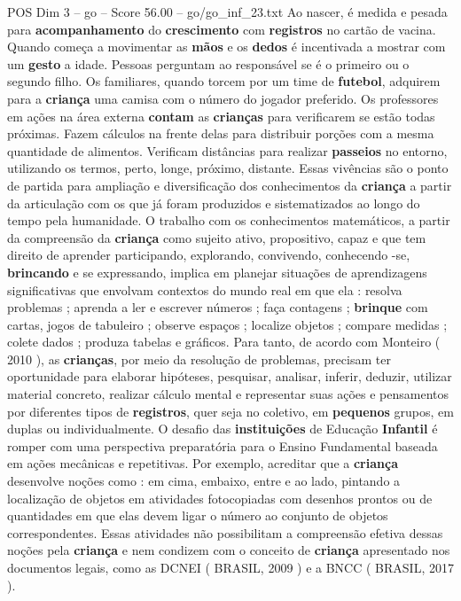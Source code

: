 \begin{textsample}{POS Dim 3 – go – Score 56.00 – go/go\_inf\_23.txt}
Ao nascer, é medida e pesada para \textbf{acompanhamento} do \textbf{crescimento} com \textbf{registros} no cartão de vacina.
Quando começa a movimentar as \textbf{mãos} e os \textbf{dedos} é incentivada a mostrar com um \textbf{gesto} a idade.
Pessoas perguntam ao responsável se é o primeiro ou o segundo filho.
Os familiares, quando torcem por um time de \textbf{futebol}, adquirem para a \textbf{criança} uma camisa com o número do jogador preferido.
Os professores em ações na área externa \textbf{contam} as \textbf{crianças} para verificarem se estão todas próximas.
Fazem cálculos na frente delas para distribuir porções com a mesma quantidade de alimentos.
Verificam distâncias para realizar \textbf{passeios} no entorno, utilizando os termos, perto, longe, próximo, distante.
Essas vivências são o ponto de partida para ampliação e diversificação dos conhecimentos da \textbf{criança} a partir da articulação com os que já foram produzidos e sistematizados ao longo do tempo pela humanidade.
O trabalho com os conhecimentos matemáticos, a partir da compreensão da \textbf{criança} como sujeito ativo, propositivo, capaz e que tem direito de aprender participando, explorando, convivendo, conhecendo -se, \textbf{brincando} e se expressando, implica em planejar situações de aprendizagens significativas que envolvam contextos do mundo real em que ela : resolva problemas ; aprenda a ler e escrever números ; faça contagens ; \textbf{brinque} com cartas, jogos de tabuleiro ; observe espaços ; localize objetos ; compare medidas ; colete dados ; produza tabelas e gráficos.
Para tanto, de acordo com Monteiro ( 2010 ), as \textbf{crianças}, por meio da resolução de problemas, precisam ter oportunidade para elaborar hipóteses, pesquisar, analisar, inferir, deduzir, utilizar material concreto, realizar cálculo mental e representar suas ações e pensamentos por diferentes tipos de \textbf{registros}, quer seja no coletivo, em \textbf{pequenos} grupos, em duplas ou individualmente.
O desafio das \textbf{instituições} de Educação \textbf{Infantil} é romper com uma perspectiva preparatória para o Ensino Fundamental baseada em ações mecânicas e repetitivas.
Por exemplo, acreditar que a \textbf{criança} desenvolve noções como : em cima, embaixo, entre e ao lado, pintando a localização de objetos em atividades fotocopiadas com desenhos prontos ou de quantidades em que elas devem ligar o número ao conjunto de objetos correspondentes.
Essas atividades não possibilitam a compreensão efetiva dessas noções pela \textbf{criança} e nem condizem com o conceito de \textbf{criança} apresentado nos documentos legais, como as DCNEI ( BRASIL, 2009 ) e a BNCC ( BRASIL, 2017 ).

\end{textsample}
